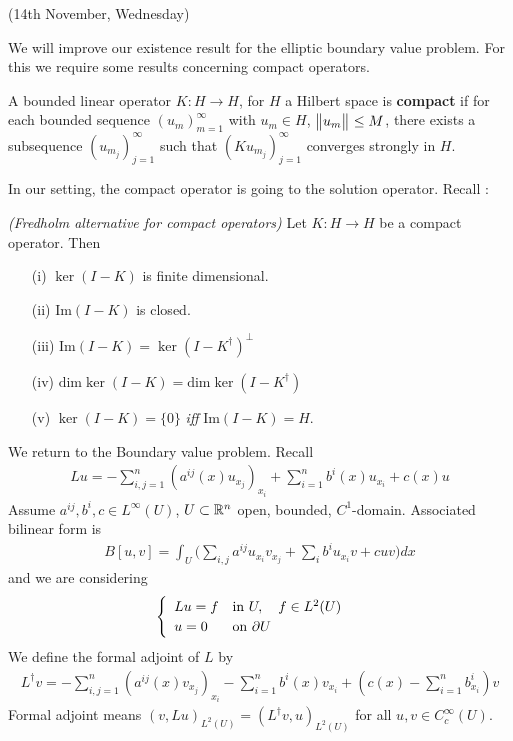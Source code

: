 \documentclass[12pt,a4paper]{report}
\begin{document}
\newday

(14th November, Wednesday)
\s

We will improve our existence result for the elliptic boundary value problem. For this we require some results concerning compact operators.
\s

 A bounded linear operator $K:H\rightarrow H$, for $H$ a Hilbert space is \textbf{compact} if for each bounded sequence $(u_m)_{m=1}^{\infty}$ with $u_m \in H$, $\bigl\lVert u_m\bigr\rVert_{} \leq M$, there exists a subsequence $(u_{m_j})_{j=1}^{\infty}$ such that $(Ku_{m_j})_{j=1}^{\infty}$ converges strongly in $H$.
\s

In our setting, the compact operator is going to the solution operator. Recall :
\s

\thm \emph{(Fredholm alternative for compact operators)} Let $K:H\rightarrow H$ be a compact operator. Then
\begin{itemize}
\item[(i)] $\ker (I-K)$ is finite dimensional.
\item[(ii)] $\text{Im} (I-K)$ is closed.
\item[(iii)] $\text{Im} (I-K) = \ker (I-K^{\dagger})^{\perp}$
\item[(iv)] $\text{dim} \ker (I-K) = \text{dim} \ker (I-K^{\dagger})$
\item[(v)] $\ker (I-K)= \{ 0 \}$ \emph{iff} $\text{Im} (I-K) =H$.
\end{itemize}
\s

We return to the Boundary value problem. Recall
\begin{align*}
Lu = -\sum_{i,j=1}^n (a^{ij}(x) u_{x_j})_{x_i} + \sum_{i=1}^n b^i(x)u_{x_i} + c(x) u
\end{align*}
Assume $a^{ij}, b^i, c\in L^{\infty}(U)$, $U\subset \mathbb{R}^n$ open, bounded, $C^1$-domain. Associated bilinear form is
\begin{align*}
B[u,v] = \int_U \Big( \sum_{i,j} a^{ij} u_{x_i}v_{x_j} + \sum_{i} b^i u_{x_i} v + cuv \Big) dx
\end{align*}
and we are considering
\begin{align*}
\begin{cases}
\begin{array}{ll}
Lu = f & \text{in } U,\quad f\in L^2(U) \\
u = 0 & \text{on } \partial U
\end{array}
\end{cases}
\end{align*}
We define the formal adjoint of $L$ by
\begin{align*}
L^{\dagger} v = -\sum_{i,j=1}^n (a^{ij}(x) v_{x_j})_{x_i} - \sum_{i=1}^n b^i(x)v_{x_i} + (c(x) - \sum_{i=1}^n b_{x_i}^i ) v
\end{align*}
Formal adjoint means $(v,Lu)_{L^2(U)} = (L^{\dagger}v,u)_{L^2(U)}$ for all $u,v\in C_c^{\infty}(U)$.
\end{document}
